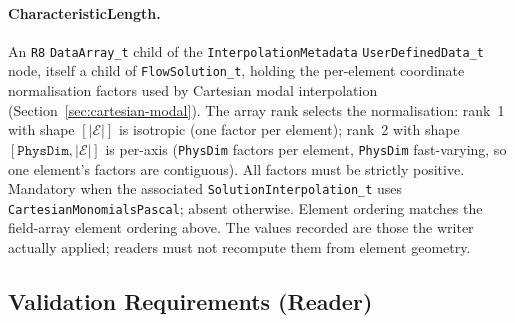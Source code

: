 \documentclass[11pt,letterpaper]{article}
\begin{document}
\paragraph{CharacteristicLength.}
An \texttt{R8} \texttt{DataArray\_t} child of the \texttt{InterpolationMetadata}
\texttt{UserDefinedData\_t} node, itself a child of \texttt{FlowSolution\_t},
holding the per-element coordinate normalisation factors used by Cartesian modal
interpolation (Section~\ref{sec:cartesian-modal}).  The array rank selects the
normalisation:
rank~1 with shape $[|\mathcal{E}|]$ is isotropic (one factor per element); rank~2 with
shape $[\texttt{PhysDim}, |\mathcal{E}|]$ is per-axis (\texttt{PhysDim} factors per
element, \texttt{PhysDim} fast-varying, so one element's factors are contiguous).  All
factors must be strictly positive.  Mandatory when the associated
\texttt{SolutionInterpolation\_t} uses \texttt{CartesianMonomialsPascal}; absent
otherwise.  Element ordering matches the field-array element ordering above.  The
values recorded are those the writer actually applied; readers must not recompute them
from element geometry.

\subsection{Validation Requirements (Reader)}
\label{sec:validation}
\end{document}
